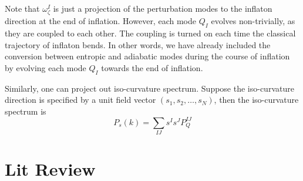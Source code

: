 \documentclass[11pt]{article}
\begin{document}
Note that $\omega_\zeta^I$ is just a projection of the perturbation modes to the inflaton direction at the end of inflation. However, each mode $Q_I$ evolves non-trivially, as they are coupled to each other. The coupling is turned on each time the classical trajectory of inflaton bends. In other words, we have already included the conversion between entropic and adiabatic modes during the course of inflation by evolving each mode $Q_I$ towards the end of inflation. 

Similarly, one can project out iso-curvature spectrum. Suppose the iso-curvature direction is specified by a unit field vector $(s_1, s_2, \dots, s_N)$, then the iso-curvature spectrum is 
\begin{equation}
P_s (k) = \sum_{IJ} s^I s^J P_Q^{IJ}
\end{equation}

\section{Lit Review}
\end{document}
